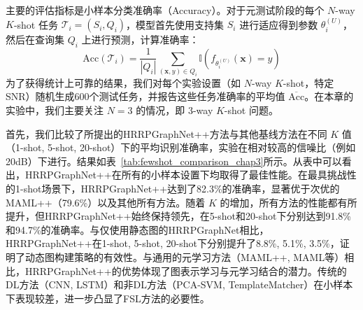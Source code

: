 主要的评估指标是小样本分类准确率（Accuracy）。对于元测试阶段的每个 $N$-way $K$-shot 任务 $\mathcal{T}_i = (S_i, Q_i)$，模型首先使用支持集 $S_i$ 进行适应得到参数 $\theta_i^{(U)}$，然后在查询集 $Q_i$ 上进行预测，计算准确率：
\begin{equation}
    \text{Acc}(\mathcal{T}_i) = \frac{1}{|Q_i|} \sum_{(\mathbf{x},y) \in Q_i} \mathbb{I}(f_{\theta_i^{(U)}}(\mathbf{x}) = y)
    \label{eq:accuracy_metric}
\end{equation}
为了获得统计上可靠的结果，我们对每个实验设置（如 $N$-way $K$-shot，特定SNR）随机生成600个测试任务，并报告这些任务准确率的平均值 $\overline{\text{Acc}}$。在本章的实验中，我们主要关注 $N=3$ 的情况，即 3-way $K$-shot 问题。

首先，我们比较了所提出的HRRPGraphNet++方法与其他基线方法在不同 $K$ 值（1-shot, 5-shot, 20-shot）下的平均识别准确率，实验在相对较高的信噪比（例如20dB）下进行。结果如表~\ref{tab:fewshot_comparison_chap3}所示。从表中可以看出，HRRPGraphNet++在所有的小样本设置下均取得了最佳性能。在最具挑战性的1-shot场景下，HRRPGraphNet++达到了82.3\%的准确率，显著优于次优的MAML++（79.6\%）以及其他所有方法。随着 $K$ 的增加，所有方法的性能都有所提升，但HRRPGraphNet++始终保持领先，在5-shot和20-shot下分别达到91.8\%和94.7\%的准确率。与仅使用静态图的HRRPGraphNet相比，HRRPGraphNet++在1-shot, 5-shot, 20-shot下分别提升了8.8\%, 5.1\%, 3.5\%，证明了动态图构建策略的有效性。与通用的元学习方法（MAML++, MAML等）相比，HRRPGraphNet++的优势体现了图表示学习与元学习结合的潜力。传统的DL方法（CNN, LSTM）和非DL方法（PCA-SVM, TemplateMatcher）在小样本下表现较差，进一步凸显了FSL方法的必要性。

